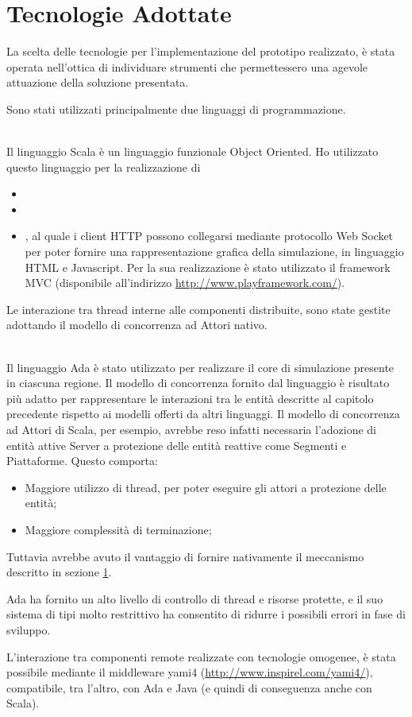 \chapter{Tecnologie Adottate}

La scelta delle tecnologie per l'implementazione del prototipo realizzato, è stata operata nell'ottica di individuare strumenti che permettessero una agevole attuazione della soluzione presentata.

Sono stati utilizzati principalmente due linguaggi di programmazione.
	\begin{description}
		\item {} \\
		Il linguaggio Scala è un linguaggio funzionale Object Oriented. Ho utilizzato questo linguaggio per la realizzazione di 
			\begin{itemize}
				\item {}
				\item {}
				\item {}, al quale i client HTTP possono collegarsi mediante protocollo Web Socket per poter fornire una rappresentazione grafica della simulazione, in linguaggio HTML e Javascript. Per la sua realizzazione è stato utilizzato il framework MVC  (disponibile all'indirizzo \url{http://www.playframework.com/}).
			\end{itemize}
		Le interazione tra thread interne alle componenti distribuite, sono state gestite adottando il modello di concorrenza ad Attori nativo. 
		\item {} \\
		Il linguaggio Ada è stato utilizzato per realizzare il core di simulazione presente in ciascuna regione. Il modello di concorrenza fornito dal linguaggio è risultato più adatto per rappresentare le interazioni tra le entità descritte al capitolo precedente rispetto ai modelli offerti da altri linguaggi. Il modello di concorrenza ad Attori di Scala, per esempio, avrebbe reso infatti necessaria l'adozione di entità attive Server a protezione delle entità reattive come Segmenti e Piattaforme. Questo comporta:
			\begin{itemize}
				\item Maggiore utilizzo di thread, per poter eseguire gli attori a protezione delle entità;
				\item Maggiore complessità di terminazione;
			\end{itemize}
		Tuttavia avrebbe avuto il vantaggio di fornire nativamente il meccanismo descritto in sezione \ref{}.
		
		Ada ha fornito un alto livello di controllo di thread e risorse protette, e il suo sistema di tipi molto restrittivo ha consentito di ridurre i possibili errori in fase di sviluppo.
		  
	\end{description}
	
L'interazione tra componenti remote realizzate con tecnologie omogenee, è stata possibile mediante il middleware yami4 (\url{http://www.inspirel.com/yami4/}), compatibile, tra l'altro, con Ada e Java (e quindi di conseguenza anche con Scala).




